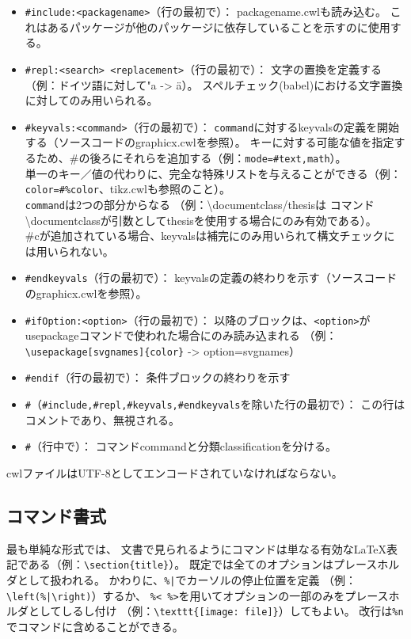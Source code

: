 \begin{itemize}
\item
  \verb+#include:<packagename>+（行の最初で）：
  packagename.cwlも読み込む。
  これはあるパッケージが他のパッケージに依存していることを示すのに使用する。
\item
  \verb+#repl:<search> <replacement>+（行の最初で）：
  文字の置換を定義する（例：ドイツ語に対して"a -\textgreater{} \"{a}）。
  スペルチェック(babel)における文字置換に対してのみ用いられる。
\item
  \verb+#keyvals:<command>+（行の最初で）：
  \verb+command+に対するkeyvalsの定義を開始する（ソースコードのgraphicx.cwlを参照）。
  キーに対する可能な値を指定するため、\#の後ろにそれらを追加する（例：\verb+mode=#text,math+）。\\
  単一のキー／値の代わりに、完全な特殊リストを与えることができる（例：\verb+color=#%color+、tikz.cwlも参照のこと）。\\
  \verb+command+は2つの部分からなる
  （例：\textbackslash{}documentclass/thesisは
  コマンド\textbackslash{}documentclassが引数としてthesisを使用する場合にのみ有効である）。\\
  \#cが追加されている場合、keyvalsは補完にのみ用いられて構文チェックには用いられない。
\item
  \verb+#endkeyvals+（行の最初で）：
  keyvalsの定義の終わりを示す（ソースコードのgraphicx.cwlを参照）。
\item
  \verb+#ifOption:<option>+（行の最初で）：
  以降のブロックは、\verb+<option>+がusepackageコマンドで使われた場合にのみ読み込まれる
（例：\verb+\usepackage[svgnames]{color}+  -\textgreater{} option=svgnames）
\item
  \verb+#endif+（行の最初で）： 条件ブロックの終わりを示す
\item
  \verb+#+（\verb+#include,#repl,#keyvals,#endkeyvals+を除いた行の最初で）：
  この行はコメントであり、無視される。
\item
  \verb+#+（行中で）： コマンドcommandと分類classificationを分ける。
\end{itemize}

cwlファイルはUTF-8としてエンコードされていなければならない。

\subsection{コマンド書式}

最も単純な形式では、
文書で見られるようにコマンドは単なる有効なLaTeX表記である（例：\verb+\section{title}+）。
既定では全てのオプションはプレースホルダとして扱われる。
かわりに、\verb+%|+でカーソルの停止位置を定義
（例：\verb+\left(%|\right)+）するか、
\verb+%< %>+を用いてオプションの一部のみをプレースホルダとしてしるし付け
（例：\verb+\texttt{[image: file]}+）してもよい。
改行は\verb+%n+でコマンドに含めることができる。

